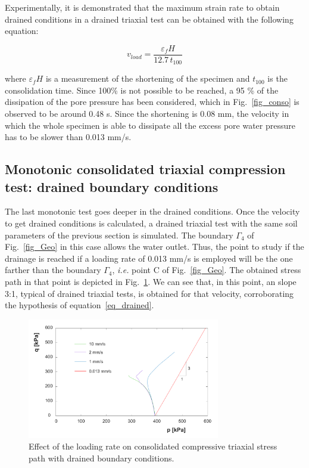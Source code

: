 \documentclass[preprint,12pt,a4paper]{elsarticle}
\begin{document}
Experimentally, it is demonstrated that the maximum strain rate to obtain drained conditions in a drained triaxial test can be obtained with the following equation:

\begin{equation}
v_{load}=\frac{\varepsilon_f H}{12.7 \, t_{100}}
\end{equation}\label{eq_drained}

where $\varepsilon_f H$ is a measurement of the shortening of the specimen and $t_{100}$ is the consolidation time. Since 100\% is not possible to be reached, a 95 \% of the dissipation of the pore pressure has been considered, which in Fig.~\ref{fig_conso} is observed to be around 0.48 s. Since the shortening is 0.08 mm, the velocity in which the whole specimen is able to dissipate all the excess pore water pressure has to be slower than 0.013 mm/s.

\subsection{Monotonic consolidated triaxial compression test: drained boundary conditions}
\label{sec:43}
The last monotonic test goes deeper in the drained conditions. Once the velocity to get drained conditions is calculated, a drained triaxial test with the same soil parameters of the previous section is simulated. The boundary $\Gamma_4$ of Fig.~\ref{fig_Geo} in this case allows the water outlet. Thus, the point to study if the drainage is reached if a loading rate of 0.013 mm/s is employed will be the one farther than the boundary $\Gamma_4$, \textit{i.e.} point C of Fig.~\ref{fig_Geo}.  The obtained stress path in that point is depicted in Fig.~\ref{fig_pq_drained}. We can see that, in this point, an slope 3:1, typical of drained triaxial tests, is obtained for that velocity, corroborating the hypothesis of equation~\eqref{eq_drained}.

\begin{figure}
\centering
\includegraphics[width=0.75\textwidth]{Figs/pq_drained.pdf}
\caption{Effect of the loading rate on consolidated compressive triaxial stress path with drained boundary conditions.}
\label{fig_pq_drained}
\end{figure}
\end{document}
